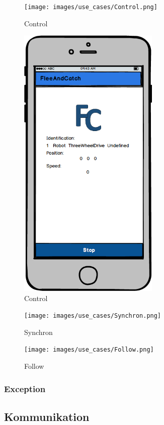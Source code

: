 \begin{figure}[h]
	\begin{center}
		\texttt{[image: images/use\_cases/Control.png]}
	\end{center}
	\caption{Control}
	\label{fig:UC_Control}
\end{figure}
\begin{figure}[h]
	\begin{center}
		\includegraphics[width=0.6\textwidth]{images/mockups/Control.png}
	\end{center}
	\caption{Control}
	\label{fig:Control}
\end{figure}

\begin{figure}[h]
	\begin{center}
		\texttt{[image: images/use\_cases/Synchron.png]}
	\end{center}
	\caption{Synchron}
	\label{fig:UC_Synchron}
\end{figure}

\begin{figure}[h]
	\begin{center}
		\texttt{[image: images/use\_cases/Follow.png]}
	\end{center}
	\caption{Follow}
	\label{fig:UC_Follow}
\end{figure}

\subsubsection{Exception}
\subsection{Kommunikation}